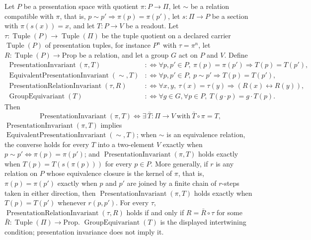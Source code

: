 \begin{theorem}\label{thm:F29}
Let \(P\) be a presentation space with quotient
\(\pi:P\to\Pi\), let \(\sim\) be a relation compatible
with \(\pi\), that is, \(p\sim p'\Rightarrow\pi(p)=\pi(p')\), let \(s:\Pi\to P\) be a section with
\(\pi(s(x))=x\), and let \(T:P\to V\) be a readout.  Let
\(\tau:\operatorname{Tuple}(P)\to\operatorname{Tuple}(\Pi)\) be the
tuple quotient on a declared carrier \(\operatorname{Tuple}(P)\) of presentation
tuples, for instance \(P^n\) with \(\tau=\pi^n\), let \(R:\operatorname{Tuple}(P)\to\mathrm{Prop}\) be a
relation, and let a group \(G\) act on \(P\) and \(V\).  Define
\begin{align*}
  \operatorname{PresentationInvariant}(\pi,T)
  &:\Longleftrightarrow
  \forall p,p'\in P,\ \pi(p)=\pi(p')\Rightarrow T(p)=T(p'),\\
  \operatorname{EquivalentPresentationInvariant}(\sim,T)
  &:\Longleftrightarrow
  \forall p,p'\in P,\ p\sim p'\Rightarrow T(p)=T(p'),\\
  \operatorname{PresentationRelationInvariant}(\tau,R)
  &:\Longleftrightarrow
  \forall x,y,\ \tau(x)=\tau(y)\Rightarrow (R(x)\leftrightarrow R(y)),\\
  \operatorname{GroupEquivariant}(T)
  &:\Longleftrightarrow
  \forall g\in G,\forall p\in P,\ T(g\cdot p)=g\cdot T(p).
\end{align*}
Then
\[
  \operatorname{PresentationInvariant}(\pi,T)
  \iff
  \exists\,\bar T:\Pi\to V\ \text{with}\ \bar T\circ\pi=T,
\]
\(\operatorname{PresentationInvariant}(\pi,T)\) implies
\(\operatorname{EquivalentPresentationInvariant}(\sim,T)\); when \(\sim\) is
an equivalence relation, the converse holds for every \(T\) into a
two-element \(V\) exactly when \(p\sim p'\iff\pi(p)=\pi(p')\); and
\(\operatorname{PresentationInvariant}(\pi,T)\) holds exactly when
\(T(p)=T(s(\pi(p)))\) for every \(p\in P\). More generally, if \(r\) is any
relation on \(P\) whose equivalence closure is the kernel of \(\pi\), that is,
\(\pi(p)=\pi(p')\) exactly when \(p\) and \(p'\) are joined by a finite chain
of \(r\)-steps taken in either direction, then
\(\operatorname{PresentationInvariant}(\pi,T)\) holds exactly when
\(T(p)=T(p')\) whenever \(r(p,p')\). For every \(\tau\), \(\operatorname{PresentationRelationInvariant}(\tau,R)\) holds if and only if
\(R=\bar R\circ\tau\) for some \(\bar R:\operatorname{Tuple}(\Pi)\to\mathrm{Prop}\).
\(\operatorname{GroupEquivariant}(T)\) is the displayed intertwining condition;
presentation invariance does not imply it.
\end{theorem}
